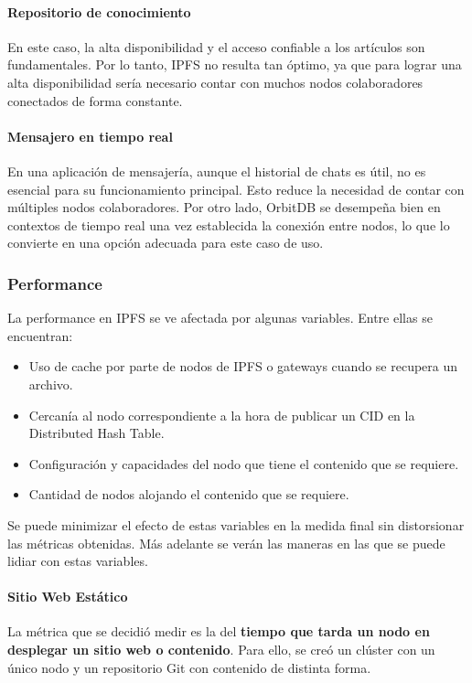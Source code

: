 \paragraph{Repositorio de conocimiento}
En este caso, la alta disponibilidad y el acceso confiable a los artículos son fundamentales. Por lo tanto, IPFS no resulta tan óptimo, ya que para lograr una alta disponibilidad sería necesario contar con muchos nodos colaboradores conectados de forma constante.

\paragraph{Mensajero en tiempo real}
En una aplicación de mensajería, aunque el historial de chats es útil, no es esencial para su funcionamiento principal. Esto reduce la necesidad de contar con múltiples nodos colaboradores. Por otro lado, OrbitDB se desempeña bien en contextos de tiempo real una vez establecida la conexión entre nodos, lo que lo convierte en una opción adecuada para este caso de uso.

\subsubsection{Performance}

La performance en IPFS se ve afectada por algunas variables. Entre ellas se encuentran:

\begin{itemize}
    \item Uso de cache por parte de nodos de IPFS o gateways cuando se recupera un archivo.
    \item Cercanía al nodo correspondiente a la hora de publicar un CID en la Distributed Hash Table.
    \item Configuración y capacidades del nodo que tiene el contenido que se requiere.
    \item Cantidad de nodos alojando el contenido que se requiere.
\end{itemize}

 Se puede minimizar  el efecto de estas variables en la medida final sin distorsionar las métricas obtenidas. Más adelante se verán las maneras en las que se puede lidiar con estas variables.

\paragraph{Sitio Web Estático}
La métrica que se decidió medir es la del \textbf{tiempo que tarda un nodo en desplegar un sitio web o contenido}. Para ello, se creó un clúster con un único nodo y un repositorio Git con contenido de distinta forma.


